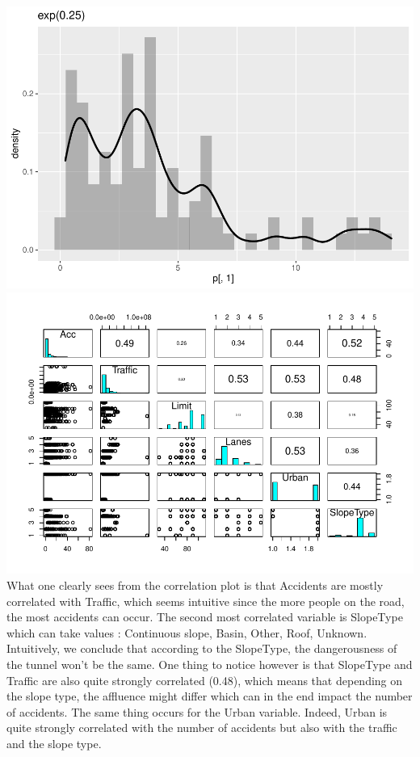 \documentclass[
]{article}
\begin{document}
\includegraphics{Report_files/figure-latex/Accidents corr and fit-1.pdf}
\includegraphics{Report_files/figure-latex/Accidents corr and fit-2.pdf}
What one clearly sees from the correlation plot is that Accidents are
mostly correlated with Traffic, which seems intuitive since the more
people on the road, the most accidents can occur. The second most
correlated variable is SlopeType which can take values : Continuous
slope, Basin, Other, Roof, Unknown. Intuitively, we conclude that
according to the SlopeType, the dangerousness of the tunnel won't be the
same. One thing to notice however is that SlopeType and Traffic are also
quite strongly correlated (0.48), which means that depending on the
slope type, the affluence might differ which can in the end impact the
number of accidents. The same thing occurs for the Urban variable.
Indeed, Urban is quite strongly correlated with the number of accidents
but also with the traffic and the slope type.\\
\end{document}
